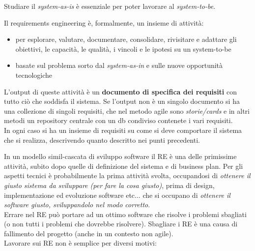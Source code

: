 \documentclass[a4paper,12pt, oneside]{book}
\begin{document}
Studiare il \textit{system-as-is} è essenziale per poter lavorare al
\textit{system-to-be}.
\newpage
\begin{definizione}
  Il requirements engineering è, formalmente, un insieme di attività:
  \begin{itemize}
    \item per esplorare, valutare, documentare, consolidare, rivisitare e
    adattare gli obiettivi, le capacità, le qualità, i vincoli e le ipotesi su
    un \textup{system-to-be} 
    \item basate sul problema sorto dal \textit{system-as-in} e sulle nuove
    opportunità tecnologiche
  \end{itemize}
  L'output di queste attività è un \textbf{documento di specifica dei requisiti}
  con tutto ciò che soddisfa il sistema. Se l'output non è un singolo documento
  si ha una collezione di singoli requisiti, che nel metodo agile sono
  \textit{storie/cards} e in altri metodi un repository centrale con un db
  condiviso contenete i vari requisiti.\\
  In ogni caso si ha un insieme di requisiti su come si deve comportare il
  sistema che si realizza, descrivendo quanto descritto nei punti precedenti.
\end{definizione}
In un modello simil-cascata di sviluppo software il RE è una delle primissime
attività, subito dopo quelle di definizione del sistema e di business plan. Per
gli aspetti tecnici è probabilmente la prima attività svolta, occupandosi di
\textit{ottenere il giusto sistema da sviluppare (per fare la cosa giusto)},
prima di design, 
implementazione ed evoluzione software etc$\ldots$ che si occupano di
\textit{ottenere il software giusto, sviluppandolo nel modo corretto}.\\
Errare nel RE può portare ad un ottimo software che risolve i problemi sbagliati
(o non tutti i problemi che dovrebbe risolvere). Sbagliare i RE è una causa di
fallimento del progetto (anche in un contesto non agile).\\
Lavorare sui RE non è semplice per diversi motivi:
\end{document}
